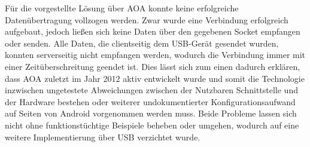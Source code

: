         Für die vorgestellte Lösung über AOA konnte keine erfolgreiche Datenübertragung vollzogen werden. Zwar wurde eine Verbindung erfolgreich aufgebaut, jedoch ließen sich keine Daten über den gegebenen Socket empfangen oder senden. Alle Daten, die clientseitig dem USB-Gerät gesendet wurden, konnten serverseitig nicht empfangen werden, wodurch die Verbindung immer mit einer Zeitüberschreitung geendet ist. Dies lässt sich zum einen dadurch erklären, dass AOA zuletzt im Jahr 2012 aktiv entwickelt wurde  und somit die Technologie inzwischen ungetestete Abweichungen zwischen der Nutzbaren Schnittstelle und der Hardware bestehen oder weiterer undokumentierter Konfigurationsaufwand auf Seiten von Android vorgenommen werden muss. Beide Probleme lassen sich nicht ohne funktionstüchtige Beispiele beheben oder umgehen, wodurch auf eine weitere Implementierung über USB verzichtet wurde.